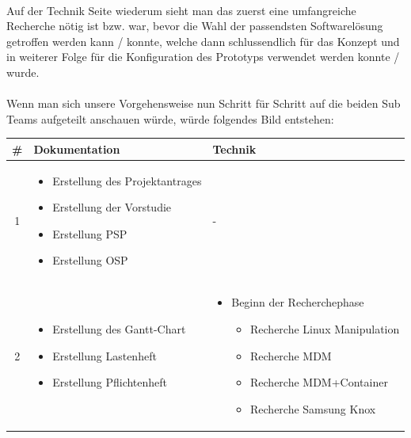 \paragraph*{}
Auf der Technik Seite wiederum sieht man das zuerst eine umfangreiche Recherche nötig ist bzw. war, bevor die Wahl der passendsten Softwarelösung getroffen werden kann / konnte, welche dann schlussendlich für das Konzept und in weiterer Folge für die Konfiguration des Prototyps verwendet werden konnte / wurde.
\paragraph*{}
Wenn man sich unsere Vorgehensweise nun Schritt für Schritt auf die beiden Sub Teams aufgeteilt anschauen würde, würde folgendes Bild entstehen:

\begin{table}
	\centering
	\begin{tabular}{| c | p{6cm} | p{7cm} |}
		\hline
		\textbf \# & \textbf{Dokumentation} & \textbf{Technik}
		\\\hline %
		1 
		&%
		\begin{itemize}
			\item Erstellung des Projektantrages
			\item Erstellung der Vorstudie
			\item Erstellung PSP
			\item Erstellung OSP
		\end{itemize}
		&%
		-
		\\\hline %
		2
		&%
		\begin{itemize}
			\item Erstellung des Gantt-Chart
			\item Erstellung Lastenheft
			\item Erstellung Pflichtenheft
		\end{itemize}
		&%
		\begin{itemize}
			\item Beginn der Recherchephase
			\begin{itemize}
				\item Recherche Linux Manipulation
				\item Recherche MDM
				\item Recherche MDM+Container
				\item Recherche Samsung Knox
			\end{itemize}
		\end{itemize}

\end{tabular}
\end{table}
